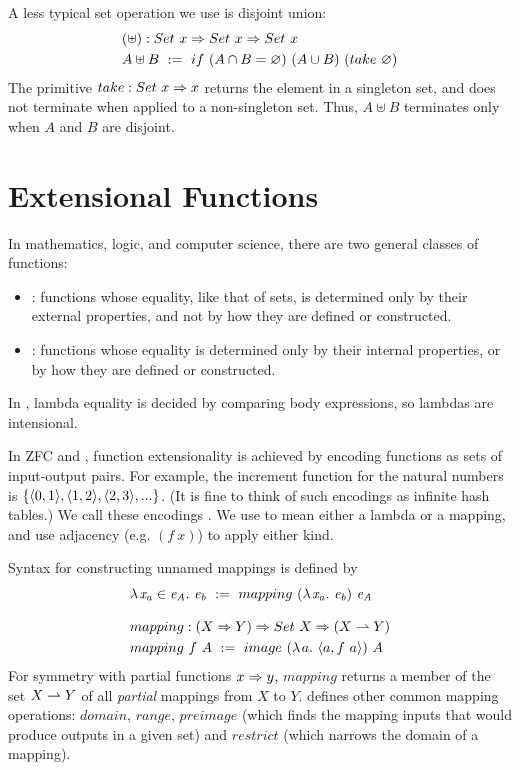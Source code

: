 A less typical set operation we use is disjoint union:
\begin{equation}
\begin{aligned}
	&(\uplus) : Set~x \Rightarrow Set~x \Rightarrow Set~x \\
	&A \uplus B \ := \ if~(A \cap B = \varnothing)~(A \cup B)~(take~\varnothing)
\end{aligned}
\end{equation}
The primitive $take : Set~x \Rightarrow x$ returns the element in a singleton set, and does not terminate when applied to a non-singleton set.
Thus, $A \uplus B$ terminates only when $A$ and $B$ are disjoint.

\section{Extensional Functions}

In mathematics, logic, and computer science, there are two general classes of functions:
\begin{itemize}
	\item {}: functions whose equality, like that of sets, is determined only by their external properties, and not by how they are defined or constructed.
	\item {}: functions whose equality is determined only by their internal properties, or by how they are defined or constructed.
\end{itemize}
In \lzfclang, lambda equality is decided by comparing body expressions, so lambdas are intensional.

In ZFC and \lzfclang, function extensionality is achieved by encoding functions as sets of input-output pairs.
For example, the increment function for the natural numbers is $\{{\langle{0,1}\rangle,\langle{1,2}\rangle,\langle{2,3}\rangle,...}\}$.
(It is fine to think of such encodings as infinite hash tables.)
We call these encodings .
We use  to mean either a lambda or a mapping, and use adjacency (e.g. $(f~x)$) to apply either kind.

Syntax for constructing unnamed mappings is defined by
\begin{align}
	&\fun{\mathit{x_a} \in \mathit{e_A}}{\mathit{e_b}} \ :=\ mapping~(\fun{\mathit{x_a}}\mathit{e_b})~\mathit{e_A} \\
\nonumber\\[-0.5\baselineskip]
	&\begin{aligned}
		&mapping : (X \tto Y) \tto Set~X \tto (X \pto Y) \\
		&mapping~f~A \ := \ image~(\fun{a}{\pair{a,f~a}})~A
	\end{aligned}
\end{align}
For symmetry with partial functions $x \Rightarrow y$, $mapping$ returns a member of the set $X \rightharpoonup Y$ of all \emph{partial} mappings from $X$ to $Y$.
 defines other common mapping operations: $domain$, $range$, $preimage$ (which finds the mapping inputs that would produce outputs in a given set) and $restrict$ (which narrows the domain of a mapping).

